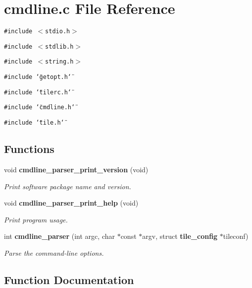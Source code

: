 \section{cmdline.c File Reference}
\label{cmdline_8c}
{\tt \#include $<$stdio.h$>$}\par
{\tt \#include $<$stdlib.h$>$}\par
{\tt \#include $<$string.h$>$}\par
{\tt \#include \char`\"{}getopt.h\char`\"{}}\par
{\tt \#include \char`\"{}tilerc.h\char`\"{}}\par
{\tt \#include \char`\"{}cmdline.h\char`\"{}}\par
{\tt \#include \char`\"{}tile.h\char`\"{}}\par
\subsection*{Functions}
\begin{CompactItemize}
\item 
void {\bf cmdline\_\-parser\_\-print\_\-version} (void)
\begin{CompactList}\small\item\em Print software package name and version. \item\end{CompactList}\item 
void {\bf cmdline\_\-parser\_\-print\_\-help} (void)
\begin{CompactList}\small\item\em Print program usage. \item\end{CompactList}\item 
int {\bf cmdline\_\-parser} (int argc, char $\ast$const $\ast$argv, struct {\bf tile\_\-config} $\ast$tileconf)
\begin{CompactList}\small\item\em Parse the command-line options. \item\end{CompactList}\end{CompactItemize}


\subsection{Function Documentation}
